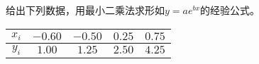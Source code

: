 \documentclass[11pt]{article}
\begin{document}
\maketitle

\thispagestyle{empty}

\newpage

\begin{question}

	\questiontext
	{
		给出下列数据，用最小二乘法求形如$y = ae^{bx}$的经验公式。
		\begin{table}[h]
			\centering
			\begin{tabular}{|c|c|c|c|c|}
				\hline
				$x_i$ & $-0.60$ & $-0.50$ & $0.25$ & $0.75$ \\ \hline
				$y_i$ & $1.00$  & $1.25$  & $2.50$ & $4.25$ \\ \hline
			\end{tabular}
		\end{table}
	}


\end{question}
\end{document}
